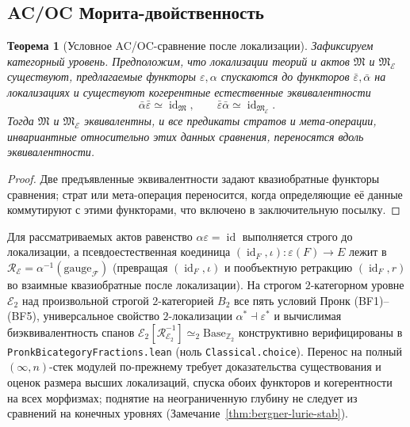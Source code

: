 \documentclass[11pt]{article}
\theoremstyle{plain}
\newtheorem{theorem}{Теорема}[section]
\theoremstyle{definition}
\newcommand{\cF}{\mathcal{F}}
\newcommand{\fM}{\mathfrak{M}}
\newcommand{\cE}{\mathcal{E}}
\DeclareMathOperator{\id}{id}
\begin{document}
\subsection{AC/OC Морита-двойственность}

\begin{theorem}[Условное AC/OC-сравнение после локализации]\label{thm:ac-oc-duality}
Зафиксируем категорный уровень. Предположим, что локализации теорий и актов $\fM$ и $\fM_\cE$ существуют, предлагаемые функторы $\varepsilon, \alpha$ спускаются до функторов $\bar\varepsilon, \bar\alpha$ на локализациях и существуют когерентные естественные эквивалентности
\[
 \bar\alpha\bar\varepsilon \simeq \id_{\fM},\qquad
 \bar\varepsilon\bar\alpha \simeq \id_{\fM_\cE}.
\]
Тогда $\fM$ и $\fM_\cE$ эквивалентны, и все предикаты стратов и мета-операции, инвариантные относительно этих данных сравнения, переносятся вдоль эквивалентности.
\end{theorem}
\begin{proof}
Две предъявленные эквивалентности задают квазиобратные функторы сравнения; страт или мета-операция переносится, когда определяющие её данные коммутируют с этими функторами, что включено в заключительную посылку.
\end{proof}
Для рассматриваемых актов равенство $\alpha\varepsilon = \id$ выполняется строго до локализации, а псевдоестественная коединица $(\id_F, \iota) : \varepsilon(F) \to E$ лежит в $\mathcal{R}_\cE = \alpha^{-1}(\mathrm{gauge}_\cF)$ (превращая $(\id_F, \iota)$ и пообъектную ретракцию $(\id_F, r)$ во взаимные квазиобратные после локализации). На строгом $2$-категорном уровне $\cE_2$ над произвольной строгой $2$-категорией $B_2$ все пять условий Пронк (BF1)--(BF5), универсальное свойство $2$-локализации $\alpha^* \dashv \varepsilon^*$ и вычислимая биэквивалентность спанов $\cE_2[\mathcal{R}_{\cE_2}^{-1}] \simeq_2 \mathrm{Base}_{\mathbb{Z}_2}$ конструктивно верифицированы в \texttt{PronkBicategoryFractions.lean} (ноль \texttt{Classical.choice}). Перенос на полный $(\infty, n)$-стек модулей по-прежнему требует доказательства существования и оценок размера высших локализаций, спуска обоих функторов и когерентности на всех морфизмах; поднятие на неограниченную глубину не следует из сравнений на конечных уровнях (Замечание~\ref{thm:bergner-lurie-stab}).
\end{document}
